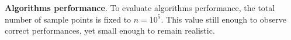 %
%
%
%
%
%





\noindent \textbf{Algorithms performance}.
To evaluate algorithms performance, the total number of sample points is fixed to $n = 10^5.$ This value still enough to observe correct performances, yet small enough to remain realistic.

